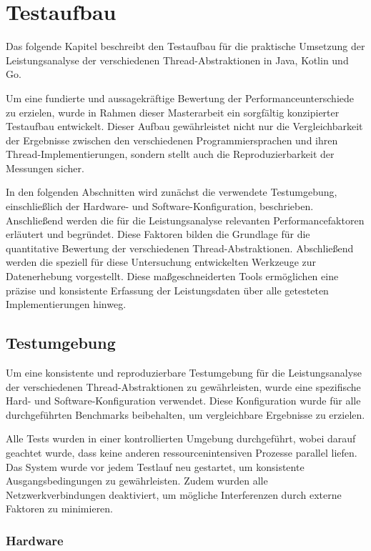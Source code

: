 \documentclass[fontsize=12pt,paper=a4,twoside=semi,parskip=half-,headsepline,headinclude]{scrreprt}
\begin{document}
\chapter{Testaufbau}

Das folgende Kapitel beschreibt den Testaufbau für die praktische Umsetzung der Leistungsanalyse der verschiedenen Thread-Abstraktionen in Java, Kotlin und Go. 

Um eine fundierte und aussagekräftige Bewertung der Per\-for\-mance\-un\-ter\-schiede zu erzielen, wurde in Rahmen dieser Masterarbeit ein sorgfältig konzipierter Testaufbau entwickelt. Dieser Aufbau gewährleistet nicht nur die Vergleichbarkeit der Ergebnisse zwischen den verschiedenen Programmiersprachen und ihren Thread-Implementierungen, sondern stellt auch die Reproduzierbarkeit der Messungen sicher.

In den folgenden Abschnitten wird zunächst die verwendete Testumgebung, einschließlich der Hardware- und Software-Konfiguration, beschrieben. Anschließend werden die für die Leistungsanalyse relevanten Performancefaktoren erläutert und begründet. Diese Faktoren bilden die Grundlage für die quantitative Bewertung der verschiedenen Thread-Abstraktionen. Abschließend werden die speziell für diese Untersuchung entwickelten Werkzeuge zur Datenerhebung vorgestellt. Diese maßgeschneiderten Tools ermöglichen eine präzise und konsistente Erfassung der Leistungsdaten über alle getesteten Implementierungen hinweg.

\section{Testumgebung}

Um eine konsistente und reproduzierbare Testumgebung für die Leistungsanalyse der verschiedenen Thread-Abstraktionen zu gewährleisten, wurde eine spezifische Hard- und Software-Konfiguration verwendet. Diese Konfiguration wurde für alle durchgeführten Benchmarks beibehalten, um vergleichbare Ergebnisse zu erzielen.

Alle Tests wurden in einer kontrollierten Umgebung durchgeführt, wobei darauf geachtet wurde, dass keine anderen ressourcenintensiven Prozesse parallel liefen. Das System wurde vor jedem Testlauf neu gestartet, um konsistente Ausgangsbedingungen zu gewährleisten. Zudem wurden alle Netzwerkverbindungen deaktiviert, um mögliche Interferenzen durch externe Faktoren zu minimieren.

\subsection{Hardware}
\end{document}
